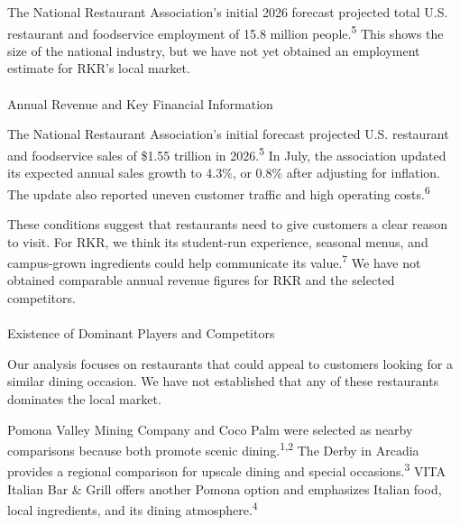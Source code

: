 \documentclass[
  12pt,
  letterpaper,
  DIV=11,
  numbers=noendperiod]{scrartcl}
\makeatletter
\let\oldparagraph\paragraph
\renewcommand{\paragraph}{
    \@ifstar
      \xxxParagraphStar
      \xxxParagraphNoStar
  }
\newcommand{\xxxParagraphStar}[1]{\oldparagraph*{#1}\mbox{}}
\newcommand{\xxxParagraphNoStar}[1]{\oldparagraph{#1}\mbox{}}
\makeatother
\begin{document}
The National Restaurant Association's initial 2026 forecast projected
total U.S. restaurant and foodservice employment of 15.8 million
people.\textsuperscript{5} This shows the size of the national industry,
but we have not yet obtained an employment estimate for RKR's local
market.

\paragraph{Annual Revenue and Key Financial
Information}\label{annual-revenue-and-key-financial-information}

The National Restaurant Association's initial forecast projected U.S.
restaurant and foodservice sales of \$1.55 trillion in
2026.\textsuperscript{5} In July, the association updated its expected
annual sales growth to 4.3\%, or 0.8\% after adjusting for inflation.
The update also reported uneven customer traffic and high operating
costs.\textsuperscript{6}

These conditions suggest that restaurants need to give customers a clear
reason to visit. For RKR, we think its student-run experience, seasonal
menus, and campus-grown ingredients could help communicate its
value.\textsuperscript{7} We have not obtained comparable annual revenue
figures for RKR and the selected competitors.

\paragraph{Existence of Dominant Players and
Competitors}\label{existence-of-dominant-players-and-competitors}

Our analysis focuses on restaurants that could appeal to customers
looking for a similar dining occasion. We have not established that any
of these restaurants dominates the local market.

Pomona Valley Mining Company and Coco Palm were selected as nearby
comparisons because both promote scenic dining.\textsuperscript{1,2} The
Derby in Arcadia provides a regional comparison for upscale dining and
special occasions.\textsuperscript{3} VITA Italian Bar \& Grill offers
another Pomona option and emphasizes Italian food, local ingredients,
and its dining atmosphere.\textsuperscript{4}
\end{document}
